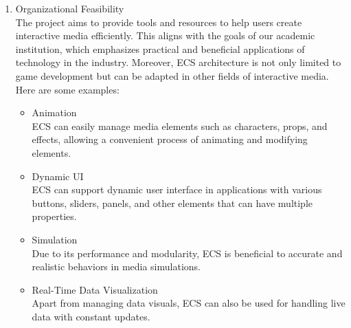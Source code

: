 \begin{enumerate}
    \item Organizational Feasibility\\
    The project aims to provide tools and resources to help users create interactive media efficiently.
    This aligns with the goals of our academic institution, which emphasizes practical and beneficial applications of technology in the industry.
    Moreover, ECS architecture is not only limited to game development but can be adapted in other fields of interactive media.
    Here are some examples:
    \begin{itemize}
        \item Animation\\
        ECS can easily manage media elements such as characters, props, and effects, allowing a convenient process of animating and modifying elements.
        \item Dynamic UI\\
        ECS can support dynamic user interface in applications with various buttons, sliders, panels, and other elements that can have multiple properties.
        \item Simulation\\
        Due to its performance and modularity, ECS is beneficial to accurate and realistic behaviors in media simulations.
        \item Real-Time Data Visualization\\
        Apart from managing data visuals, ECS can also be used for handling live data with constant updates.
    \end{itemize}

\end{enumerate}